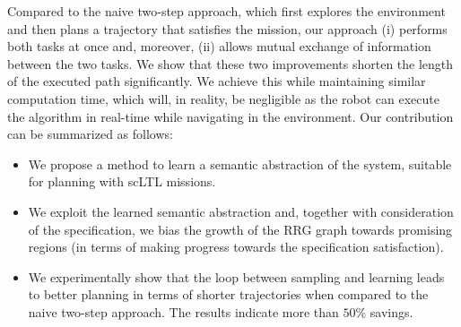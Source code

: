 





Compared to the naive two-step approach, which first explores the environment and then plans a trajectory that satisfies the mission, our approach (i) performs both tasks at once and, moreover, (ii) allows mutual exchange of information between the two tasks. 
We show that these two improvements shorten the length of the executed path significantly.
We achieve this while maintaining similar computation time, which will, in reality, be negligible as the robot can execute the algorithm in real-time while navigating in the environment.
Our contribution can be summarized as follows:
\begin{itemize}
    \item We propose a method to learn a semantic abstraction of the system, suitable for planning with scLTL missions. 
    \item We exploit the learned semantic abstraction and, together with consideration of the specification, we bias the growth of the RRG graph towards promising regions (in terms of making progress towards the specification satisfaction).
    \item We experimentally show that the loop between sampling and learning leads to better planning in terms of shorter trajectories when compared to the naive two-step approach. The results indicate more than $50\%$ savings.
\end{itemize}



